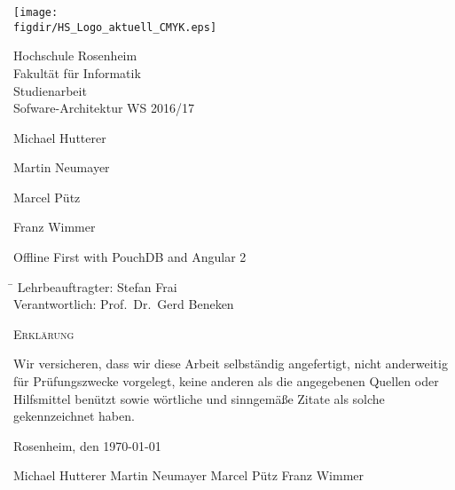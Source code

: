 \begin{titlepage}

\sffamily

\raggedleft

\texttt{[image: \\figdir/HS\_Logo\_aktuell\_CMYK.eps]}

\vfill

\centering
\Large
Hochschule Rosenheim\\
Fakultät für Informatik
\vspace{2cm}\\
 \Large
Studienarbeit\vspace{1cm}\\
 \Large
 Sofware-Architektur WS 2016/17 \\
 \Large

\vspace*{\fill}

Michael Hutterer

Martin Neumayer

Marcel Pütz

Franz Wimmer 

\vspace{1cm}

 \LARGE

Offline First with PouchDB and Angular 2
\vspace{1cm}

\flushleft
 \Large
\vspace*{\fill}

\begin{tabbing}
\hspace*{4cm}\= \kill
Lehrbeauftragter:\> Stefan Frai\\
Verantwortlich:\> Prof.\ Dr.\ Gerd Beneken\\
\end{tabbing}

\end{titlepage}

\cleardoubleemptypage

{
\large
\thispagestyle{empty}
\vspace*{\fill}

\noindent
\textsc{Erklärung}

\medskip

\noindent
Wir versicheren, dass wir diese Arbeit selbständig
angefertigt, nicht anderweitig für Prüfungszwecke
vorgelegt, keine anderen als die angegebenen Quellen
oder Hilfsmittel benützt sowie wörtliche und
sinngemäße Zitate als solche gekennzeichnet haben.

\bigskip

\noindent
Rosenheim, den \today

\vspace*{2cm}

\noindent
 Michael Hutterer\hspace{.8cm} Martin Neumayer \hspace{.8cm} Marcel Pütz \hspace{.8cm} Franz Wimmer\\
}

